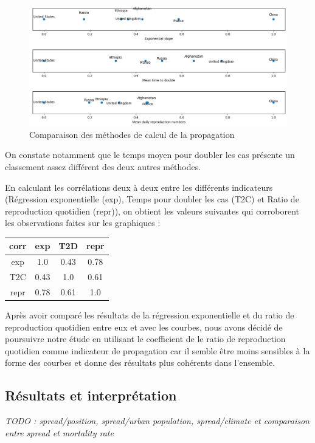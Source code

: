 \documentclass[12pt]{iEEEtran}
\begin{document}
\begin{figure}[h]
    \centering
    \includegraphics[width=\columnwidth]{img/spread_comp.png}
    \caption{Comparaison des méthodes de calcul de la propagation}

    \label{fig:spread_comp}
\end{figure}

On constate notamment que le temps moyen pour doubler les cas présente un classement assez
différent des deux autres méthodes.

En calculant les corrélations deux à deux entre les différents indicateurs (Régression exponentielle (exp),
Temps pour doubler les cas (T2C) et Ratio de reproduction quotidien (repr)), on obtient les
valeurs suivantes qui corroborent les observations faites sur les graphiques :

\begin{table}[h]
    \centering
    \begin{tabular}{|c|c|c|c|}
        \hline
        corr & exp & T2D & repr \\
        \hline
        exp & 1.0 & 0.43 & 0.78 \\
        T2C & 0.43 & 1.0 & 0.61 \\
        repr & 0.78 & 0.61 & 1.0 \\
        \hline
    \end{tabular}
\end{table}

Après avoir comparé les résultats de la régression exponentielle et du ratio de reproduction
quotidien entre eux et avec les courbes, nous avons décidé de poursuivre notre étude en
utilisant le coefficient de le ratio de reproduction quotidien comme indicateur de propagation
car il semble être moins sensibles à la forme des courbes et donne des résultats plus cohérents
dans l'ensemble.

\subsection{Résultats et interprétation}
\textit{TODO : spread/position, spread/urban population, spread/climate et comparaison entre
spread et mortality rate}
\end{document}
